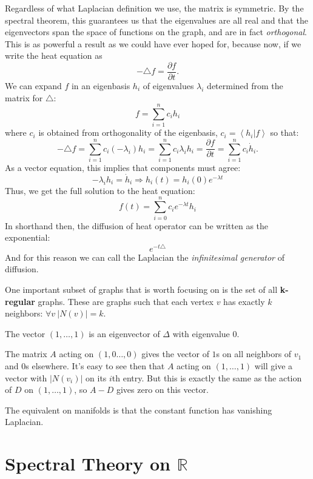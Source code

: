 	Regardless of what Laplacian definition we use, the matrix is symmetric. By the spectral theorem, this guarantees us that the eigenvalues are all real and that the eigenvectors span the space of functions on the graph, and are in fact \emph{orthogonal}. This is as powerful a result as we could have ever hoped for, because now, if we write the heat equation as
	\begin{equation}
		-\triangle f = \frac{\partial f}{\partial t}.
	\end{equation}
	We can expand $f$ in an eigenbasis $h_i$ of eigenvalues $\lambda_i$ determined from the matrix for $\triangle$:
	\begin{equation}
		f = \sum_{i=1}^n c_i h_i
	\end{equation}
	where $c_i$ is obtained from orthogonality of the eigenbasis, $c_i = \left< h_i | f \right>$ so that:
	\begin{equation}
		-\triangle f = \sum_{i=1}^n c_i (-\lambda_i) h_i = \sum_{i=1}^n c_i \lambda_i h_i = \frac{\partial f}{\partial t} = \sum_{i=1}^n c_i \dot h_i.
	\end{equation}
	As a vector equation, this implies that components must agree:
	\begin{equation}
		- \lambda_i h_i = \dot h_i \Rightarrow h_i(t) = h_i(0) e^{-\lambda t}
	\end{equation}
	Thus, we get the full solution to the heat equation:
	\begin{equation}
		f(t) = \sum_{i=0}^n c_i e^{-\lambda t} h_i
	\end{equation}
	In shorthand then, the diffusion of heat operator can be written as the exponential:
	\begin{equation*}
		e^{-t \triangle }
	\end{equation*}
	And for this reason we can call the Laplacian the \emph{infinitesimal generator} of diffusion. 
	
	One important subset of graphs that is worth focusing on is the set of all \textbf{k-regular} graphs. These are graphs such that each vertex $v$ has exactly $k$ neighbors: $\forall v ~ |N(v)|=k$.
	
	\begin{obs}
		The vector $(1, \dots, 1)$ is an eigenvector of $\Delta$ with eigenvalue $0$.
	\end{obs}
	The matrix $A$ acting on $(1, 0 \dots, 0)$ gives the vector of $1$s on all neighbors of $v_1$ and $0$s elsewhere. It's easy to see then that $A$ acting on $(1, \dots, 1)$ will give a vector with $|N(v_i)|$ on its $i$th entry. But this is exactly the same as the action of $D$ on $(1, \dots, 1)$, so $A-D$ gives zero on this vector. 
	
	The equivalent on manifolds is that the constant function has vanishing Laplacian. 
	



\section{Spectral Theory on $\mathbb R$} %
\label{sec:spectral_theory_on_mathbf_r}



